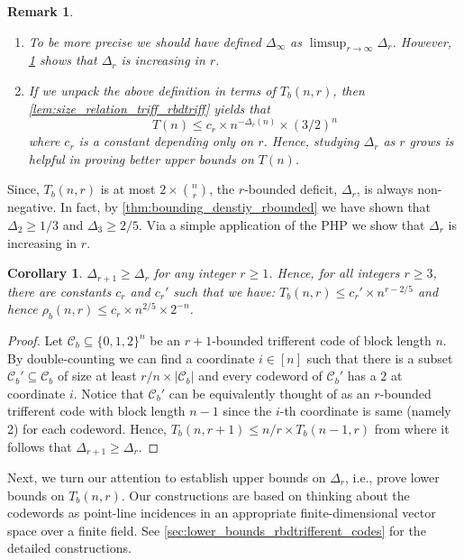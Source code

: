 \documentclass[10pt,a4paper]{article}
\newcommand{\rbdtrifferentcodes}{$r$-bounded trifferent code}
\newcommand{\boundeddeficit}{$r$-bounded deficit}
\newcommand{\calC}{\mathcal{C}}
\newcommand{\set}[1]{\{#1\}}
\newtheorem{corollary}{Corollary}[theorem]
\newtheorem{remark}[theorem]{Remark}
\DeclareMathOperator{\1}{\mathbf{1}}
\begin{document}
\begin{remark}
	\begin{enumerate}
\item To be more precise we should have defined $\Delta_\infty$ as $\limsup_{r\to \infty}\Delta_r$.
			However, \cref{cor:bouding_densityrbounded} shows that $\Delta_r$ is increasing in $r$.
\item  If we unpack the above definition in terms of $T_b(n,r)$, then \cref{lem:size_relation_triff_rbdtriff} yields that $$T(n)\leq c_r\times n^{-\Delta_r(n)}\times (3/2)^n$$ where $c_r$ is a constant depending only on $r$. Hence, studying $\Delta_r$ as $r$ grows is helpful in proving better upper bounds on $T(n)$. 
\end{enumerate}
\end{remark}

Since, $T_b(n,r)$ is at most $2\times \binom{n}{r}$, the \boundeddeficit{}, $\Delta_r$, is always non-negative.
In fact, by \cref{thm:bounding_denstiy_rbounded} we have shown that $\Delta_2\geq 1/3$ and $\Delta_3\geq 2/5$. 
Via a simple application of the PHP we show that $\Delta_r$ is increasing in $r$.
\begin{corollary}
	\label{cor:bouding_densityrbounded}
    $\Delta_{r+1}\geq \Delta_{r}$ for any integer $r\geq 1$.
	Hence, for all integers $r\geq 3$, there are constants $c_r$ and $c_r'$ such that we have: $T_b(n,r)\leq c_r'\times n^{r-2/5}$ and hence $\rho_b(n,r)\leq c_r\times n^{2/5}\times 2^{-n}$.
\end{corollary}
\begin{proof}
    Let $\calC_b\subseteq \set{0,1,2}^n$ be an $r+1$-bounded trifferent code of block length $n$.
    By double-counting we can find a coordinate $i\in [n]$ such that there is a subset $\calC_b'\subseteq\calC_b$ of size at least $r/n \times |\calC_b|$ and every codeword of $\calC_b'$ has a $2$ at coordinate $i$. Notice that $\calC_b'$ can be equivalently thought of as an \rbdtrifferentcodes{} with block length $n-1$ since the $i$-th coordinate is same (namely 2) for each codeword. Hence, $T_b(n,r+1)\leq n/r \times T_b(n-1,r)$ from where it follows that $\Delta_{r+1}\geq \Delta_{r}$.
\end{proof}

Next, we turn our attention to establish upper bounds on $\Delta_r$, i.e., prove lower bounds on $T_b(n,r)$. Our constructions are based on thinking about the codewords as point-line incidences in an appropriate finite-dimensional vector space over a finite field. See \cref{sec:lower_bounds_rbdtrifferent_codes} for the detailed constructions.
\end{document}
